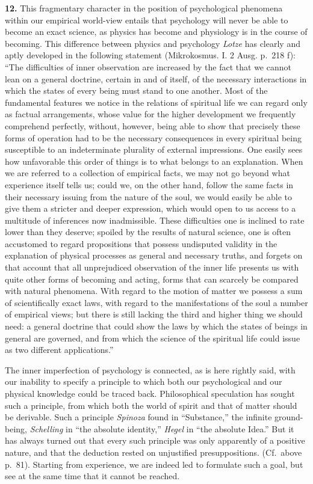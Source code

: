 \documentclass[12pt,a4paper]{book}
\newcommand{\opage}[1]{\marginnote{\footnotesize\textit{[#1]}}}
\begin{document}
\textbf{12.} This fragmentary character in the position of psychological
phenomena within our empirical world-view entails that psychology will
never be able to become an exact science, as physics has become and
physiology is in the course of becoming. This difference between physics
and psychology \emph{Lotze} has clearly and aptly developed in the
following statement (Mikrokosmus. I. 2 Ausg. p.~218 f): ``The
difficulties of inner observation are increased by the fact that we
cannot lean on a general doctrine, certain in and of itself, of the
necessary interactions in which the states of every being must stand to
one another. Most of the fundamental features we notice in the relations
of spiritual life we can regard only as factual arrangements, whose value
for the higher development we frequently comprehend perfectly, without,
however, being able to show that precisely these forms of operation had
to be the necessary consequences in every spiritual being susceptible to
an indeterminate plurality of external impressions. One easily sees how
unfavorable this order of things is to what belongs to an explanation.
When we are referred to a collection of empirical facts, we may not go
beyond what experience itself tells us; could we, on the other hand,
follow the same facts in their necessary issuing from the nature of the
soul, we would easily be able to give them a stricter and deeper
expression, which would open to us access to a multitude of inferences
now inadmissible. These difficulties one is inclined to rate lower than
they deserve; spoiled by the results of natural science,
\opage{101}one is often accustomed to regard propositions that possess
undisputed validity in the explanation of physical processes as general
and necessary truths, and forgets on that account that all unprejudiced
observation of the inner life presents us with quite other forms of
becoming and acting, forms that can scarcely be compared with natural
phenomena. With regard to the motion of matter we possess a sum of
scientifically exact laws, with regard to the manifestations of the soul
a number of empirical views; but there is still lacking the third and
higher thing we should need: a general doctrine that could show the laws
by which the states of beings in general are governed, and from which the
science of the spiritual life could issue as two different
applications.''

The inner imperfection of psychology is connected, as is here rightly
said, with our inability to specify a principle to which both our
psychological and our physical knowledge could be traced back.
Philosophical speculation has sought such a principle, from which both
the world of spirit and that of matter should be derivable. Such a
principle \emph{Spinoza} found in ``Substance,'' the infinite ground-being,
\emph{Schelling} in ``the absolute identity,'' \emph{Hegel} in ``the
absolute Idea.'' But it has always turned out that every such principle
was only apparently of a positive nature, and that the deduction rested
on unjustified presuppositions. (Cf.\ above p.~81). Starting from
experience, we are indeed led to formulate such a goal, but see at the
same time that it cannot be reached.
\end{document}
